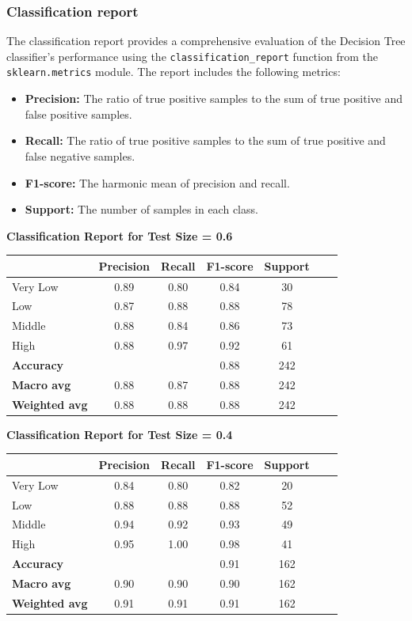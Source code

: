 \subsubsection{Classification report}

The classification report provides a comprehensive evaluation of the Decision Tree classifier's performance using the \texttt{classification\_report} function from the \texttt{sklearn.metrics} module. The report includes the following metrics:
\begin{itemize}
    \item \textbf{Precision:} The ratio of true positive samples to the sum of true positive and false positive samples.
    \item \textbf{Recall:} The ratio of true positive samples to the sum of true positive and false negative samples.
    \item \textbf{F1-score:} The harmonic mean of precision and recall.
    \item \textbf{Support:} The number of samples in each class.
\end{itemize}

\textbf{Classification Report for Test Size = 0.6}

\begin{tabular}{lcccccc}
\hline
 & \textbf{Precision} & \textbf{Recall} & \textbf{F1-score} & \textbf{Support} \\
\hline
Very Low & 0.89 & 0.80 & 0.84 & 30 \\
Low & 0.87 & 0.88 & 0.88 & 78 \\
Middle & 0.88 & 0.84 & 0.86 & 73 \\
High & 0.88 & 0.97 & 0.92 & 61 \\
\hline
\textbf{Accuracy} & & & 0.88 & 242 \\
\textbf{Macro avg} & 0.88 & 0.87 & 0.88 & 242 \\
\textbf{Weighted avg} & 0.88 & 0.88 & 0.88 & 242 \\
\hline
\end{tabular}

\vspace{2em}

\textbf{Classification Report for Test Size = 0.4}

\begin{tabular}{lcccccc}
\hline
 & \textbf{Precision} & \textbf{Recall} & \textbf{F1-score} & \textbf{Support} \\
\hline
Very Low & 0.84 & 0.80 & 0.82 & 20 \\
Low & 0.88 & 0.88 & 0.88 & 52 \\
Middle & 0.94 & 0.92 & 0.93 & 49 \\
High & 0.95 & 1.00 & 0.98 & 41 \\
\hline
\textbf{Accuracy} & & & 0.91 & 162 \\
\textbf{Macro avg} & 0.90 & 0.90 & 0.90 & 162 \\
\textbf{Weighted avg} & 0.91 & 0.91 & 0.91 & 162 \\
\hline
\end{tabular}

